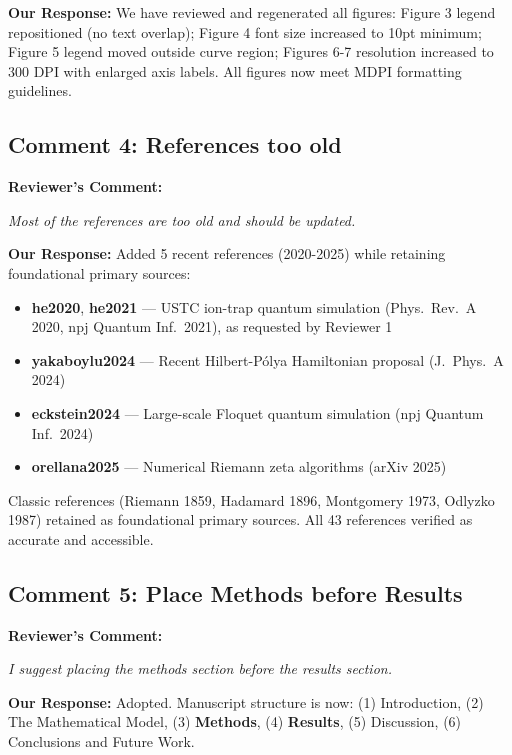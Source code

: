 \documentclass[11pt]{article}
\begin{document}
\noindent\textbf{Our Response:} We have reviewed and regenerated all figures: Figure 3 legend repositioned (no text overlap); Figure 4 font size increased to 10pt minimum; Figure 5 legend moved outside curve region; Figures 6-7 resolution increased to 300 DPI with enlarged axis labels. All figures now meet MDPI formatting guidelines.

\subsection*{Comment 4: References too old}

\noindent\textbf{Reviewer's Comment:}
\begin{quotebox}
\itshape Most of the references are too old and should be updated.
\end{quotebox}

\noindent\textbf{Our Response:} Added 5 recent references (2020-2025) while retaining foundational primary sources:
\begin{itemize}
\item \textbf{he2020}, \textbf{he2021} --- USTC ion-trap quantum simulation (Phys.~Rev.~A 2020, npj Quantum Inf.~2021), as requested by Reviewer 1
\item \textbf{yakaboylu2024} --- Recent Hilbert-P\'olya Hamiltonian proposal (J.~Phys.~A 2024)
\item \textbf{eckstein2024} --- Large-scale Floquet quantum simulation (npj Quantum Inf.~2024)
\item \textbf{orellana2025} --- Numerical Riemann zeta algorithms (arXiv 2025)
\end{itemize}
Classic references (Riemann 1859, Hadamard 1896, Montgomery 1973, Odlyzko 1987) retained as foundational primary sources. All 43 references verified as accurate and accessible.

\subsection*{Comment 5: Place Methods before Results}

\noindent\textbf{Reviewer's Comment:}
\begin{quotebox}
\itshape I suggest placing the methods section before the results section.
\end{quotebox}

\noindent\textbf{Our Response:} Adopted. Manuscript structure is now: (1) Introduction, (2) The Mathematical Model, (3) \textbf{Methods}, (4) \textbf{Results}, (5) Discussion, (6) Conclusions and Future Work.
\end{document}

